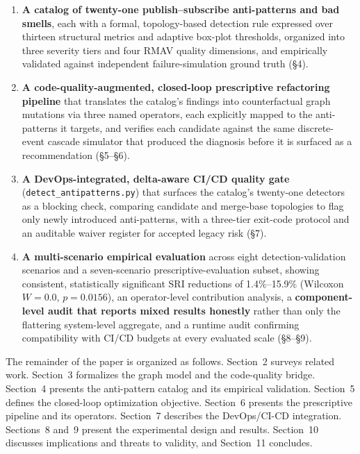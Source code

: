 \documentclass[11pt]{article}
\begin{document}
\begin{enumerate}
\item \textbf{A catalog of twenty-one publish--subscribe anti-patterns and bad smells}, each with a
  formal, topology-based detection rule expressed over thirteen structural metrics and adaptive
  box-plot thresholds, organized into three severity tiers and four RMAV quality dimensions, and
  empirically validated against independent failure-simulation ground truth (\S4).
\item \textbf{A code-quality-augmented, closed-loop prescriptive refactoring pipeline} that translates
  the catalog's findings into counterfactual graph mutations via three named operators, each
  explicitly mapped to the anti-patterns it targets, and verifies each candidate against the same
  discrete-event cascade simulator that produced the diagnosis before it is surfaced as a
  recommendation (\S5--\S6).
\item \textbf{A DevOps-integrated, delta-aware CI/CD quality gate} (\texttt{detect\_antipatterns.py})
  that surfaces the catalog's twenty-one detectors as a blocking check, comparing candidate and
  merge-base topologies to flag only newly introduced anti-patterns, with a three-tier exit-code
  protocol and an auditable waiver register for accepted legacy risk (\S7).
\item \textbf{A multi-scenario empirical evaluation} across eight detection-validation scenarios and a
  seven-scenario prescriptive-evaluation subset, showing consistent, statistically significant SRI
  reductions of 1.4\%--15.9\% (Wilcoxon $W=0.0$, $p=0.0156$), an operator-level contribution analysis,
  a \textbf{component-level audit that reports mixed results honestly} rather than only the flattering
  system-level aggregate, and a runtime audit confirming compatibility with CI/CD budgets at every
  evaluated scale (\S8--\S9).
\end{enumerate}

The remainder of the paper is organized as follows. Section~2 surveys related work. Section~3
formalizes the graph model and the code-quality bridge. Section~4 presents the anti-pattern catalog
and its empirical validation. Section~5 defines the closed-loop optimization objective. Section~6
presents the prescriptive pipeline and its operators. Section~7 describes the DevOps/CI-CD
integration. Sections~8 and~9 present the experimental design and results. Section~10 discusses
implications and threats to validity, and Section~11 concludes.

\end{document}
